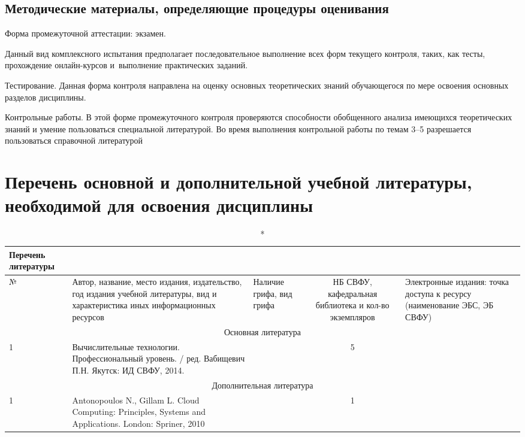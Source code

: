 \documentclass[a4paper,12pt]{article}
\begin{document}
\subsection{Методические материалы, определяющие процедуры оценивания}

Форма промежуточной аттестации: экзамен.
\par
Данный вид комплексного испытания предполагает последовательное выполнение
всех форм текущего контроля, таких, как тесты, прохождение онлайн-курсов
и~выполнение практических заданий.
\par
Тестирование. Данная форма контроля направлена на оценку основных
теоретических знаний обучающегося по мере освоения основных разделов дисциплины.
\par
Контрольные работы. В этой форме промежуточного контроля проверяются способности
обобщенного анализа имеющихся теоретических знаний и умение пользоваться
специальной литературой. Во время выполнения контрольной работы по темам 3--5 разрешается
пользоваться справочной литературой



\newpage
\section{Перечень основной и дополнительной учебной литературы, необходимой для освоения дисциплины}

  \begin{longtable}{|l|p{7cm}|p{18mm}|c|p{32mm}|}
  \caption*{Перечень литературы}\\
  \hline
  № & 
  \centering\small\arraybackslash Автор, название, место издания, издательство, год издания учебной литературы, вид и характеристика иных информационных ресурсов &
  \multicolumn{1}{p{18mm}|}{\centering\small\arraybackslash Наличие грифа, вид грифа} &
  \multicolumn{1}{p{21mm}|}{\centering\small\arraybackslash НБ СВФУ, кафедральная библиотека и кол-во экземпляров} & 
  \centering\small\arraybackslash Электронные издания: точка доступа к ресурсу (наименование ЭБС, ЭБ СВФУ)\\
  \hline
  \multicolumn{5}{|c|}{Основная литература}\\
  \hline
  1 &\raggedright\arraybackslash Вычислительные технологии. Профессиональный уровень. / ред. Вабищевич П.Н. Якутск: ИД СВФУ, 2014.  &   &  5  &  
  \\
  \hline
  
  \multicolumn{5}{|c|}{Дополнительная литература}\\
  \hline
  1 &\raggedright\arraybackslash Antonopoulos N., Gillam L. Cloud Computing: Principles, Systems and Applications. London: Spriner, 2010  &   &  1  &  
  \\
  \hline
  
  \end{longtable}
  
\end{document}

